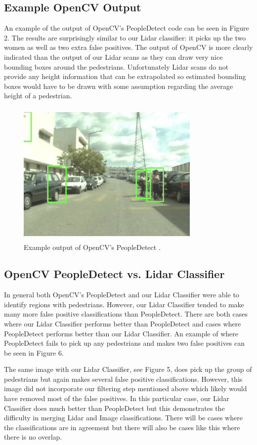 \documentclass[10pt,twocolumn,letterpaper]{article}
\begin{document}
  \subsection{Example OpenCV Output}
  An example of the output of OpenCV's PeopleDetect \cite{opencv} code can be seen in Figure 2.
  The results are surprisingly similar to our Lidar classifier: it picks up the two
  women as well as two extra false positives. The output of OpenCV is more clearly
  indicated than the output of our Lidar scans as they can draw very nice bounding
  boxes around the pedestrians. Unfortunately Lidar scans do not provide any height
  information that can be extrapolated so estimated bounding boxes would have to be
  drawn with some assumption regarding the average height of a pedestrian.

  \begin{figure}
    \includegraphics[height=2.8in, width=3.5in]{images/peopledetect.png}
    \caption{ Example output of OpenCV's PeopleDetect \cite{opencv}. }
  \end{figure}


  \subsection{OpenCV PeopleDetect vs. Lidar Classifier}
  In general both OpenCV's PeopleDetect \cite{opencv} and our Lidar Classifier were
  able to identify regions with pedestrians. However, our Lidar Classifier tended to
  make many more false positive classifications than PeopleDetect. There are both
  cases where our Lidar Classifier performs better than PeopleDetect and cases where
  PeopleDetect performs better than our Lidar Classifier. An example of where PeopleDetect
  fails to pick up any pedestrians and makes two false positives can be seen in Figure 6.

  The same image with our Lidar Classifier, see Figure 5, does pick up the group of pedestrians but again
  makes several false positive classifications. However, this image did not incorporate our
  filtering step mentioned above which likely would have removed most of the false positives.
  In this particular case, our Lidar Classifier does much better than PeopleDetect but this
  demonstrates the difficulty in merging Lidar and Image classifications. There will be cases
  where the classifications are in agreement but there will also be cases like this where there
  is no overlap.
\end{document}
